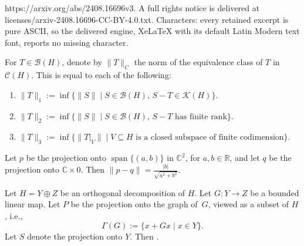 \documentclass[10pt,a4paper]{amsart}
\DeclareMathOperator{\spann}{span}
\begin{document}
https://arxiv.org/abs/2408.16696v3. A full rights notice is delivered at licenses/arxiv-2408.16696-CC-BY-4.0.txt. Characters: every retained excerpt is pure ASCII, so the delivered engine, XeLaTeX with its default Latin Modern text font, reports no missing character.
	\begin{defprop}		\label {cnorm}
		For $T\in\mathcal{B}(H)$, denote by $\|T\|_C$ the norm of the equivalence class of $T$ in $\mathcal{C}(H)$. This is equal to each of the following:
		\begin{enumerate}\itemsep=0pt
			\item[$(1)$] %
            $\|T\|_1:=\inf\{\|S\| \mid S\in\mathcal{B}(H),\, S-T\in\mathcal{K}(H)\}$.
			\item[$(2)$] %
            $\|T\|_2:=\inf\{\|S\| \mid S\in\mathcal{B}(H),\, S-T\text{ has finite rank}\}$.
			\item[$(3)$] %
            $\|T\|_3:=\inf\{\|T|_V\|\mid V\subseteq H \text{ is a closed subspace of finite codimension}\}$.
		\end{enumerate}
	\end{defprop}

	\begin{Lemma}
		\label{2dE}
		Let $p$ be the projection onto $\spann\{(a,b)\}$ in $\mathbb{C}^2$, for $a,b\in \mathbb{R}$, and let $q$ be the projection onto $\mathbb{C}\times0$. Then $\|p-q\|=\frac{|b|}{\sqrt{a^2+b^2}}$.
	\end{Lemma}

	\begin{Lemma}
		\label{graphest}
		Let $H=Y\oplus Z$ be an orthogonal decomposition of $H$. Let $G\colon Y\rightarrow Z$ be a bounded linear map. Let $P$ be the projection onto the graph of~$G$, viewed as a subset of $H$, i.e.,
		\[\Gamma(G):=\{x+Gx\mid x\in Y\}.\]
		Let $S$ denote the projection onto $Y$. Then .
	\end{Lemma}
\end{document}
